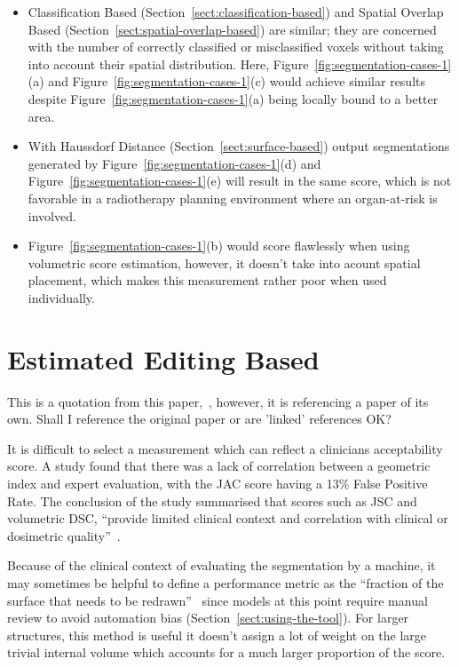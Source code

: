 \documentclass[11pt,twoside]{report}
\begin{document}
\begin{itemize}
  \item Classification Based (Section~\ref{sect:classification-based}) and Spatial Overlap Based (Section~\ref{sect:spatial-overlap-based}) are similar; they are concerned with the number of correctly classified or misclassified voxels without taking into account their spatial distribution. Here, Figure~\ref{fig:segmentation-cases-1}(a) and Figure~\ref{fig:segmentation-cases-1}(c) would achieve similar results despite Figure~\ref{fig:segmentation-cases-1}(a) being locally bound to a better area.
  \item With Haussdorf Distance (Section~\ref{sect:surface-based}) output segmentations generated by Figure~\ref{fig:segmentation-cases-1}(d) and Figure~\ref{fig:segmentation-cases-1}(e) will result in the same score, which is not favorable in a radiotherapy planning environment where an organ-at-risk is involved.
  \item Figure~\ref{fig:segmentation-cases-1}(b) would score flawlessly when using volumetric score estimation, however, it doesn't take into acount spatial placement, which makes this measurement rather poor when used individually.
\end{itemize}

\section{Estimated Editing Based}\label{sect:surface-dice}

\begin{warning}
  This is a quotation from this paper,~\cite{Sherer2021-le}, however, it is referencing a paper of its own. Shall I reference the original paper or are 'linked' references OK?
\end{warning}

It is difficult to select a measurement which can reflect a clinicians acceptability score. A study found that there was a lack of correlation between a geometric index and expert evaluation, with the JAC score having a 13\% False Positive Rate. The conclusion of the study summarised that scores such as JSC and volumetric DSC, ``provide limited clinical context and correlation with clinical or dosimetric quality''~\cite{Sherer2021-le}.

Because of the clinical context of evaluating the segmentation by a machine, it may sometimes be helpful to define a performance metric as the ``fraction of the surface that needs to be redrawn''~\cite{Nikolov2021-xe} since models at this point require manual review to avoid automation bias (Section~\ref{sect:using-the-tool}). For larger structures, this method is useful it doesn't assign a lot of weight on the large trivial internal volume which accounts for a much larger proportion of the score.
\end{document}
